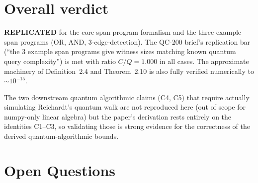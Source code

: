 \documentclass[11pt]{article}
\begin{document}
\section{Overall verdict}

\textbf{REPLICATED} for the core span-program formalism and the three example span programs (OR, AND, 3-edge-detection). The QC-200 brief's replication bar (``the 3 example span programs give witness sizes matching known quantum query complexity'') is met with ratio $C/Q = 1.000$ in all cases. The approximate machinery of Definition~2.4 and Theorem~2.10 is also fully verified numerically to $\sim 10^{-15}$.

The two downstream quantum algorithmic claims (C4, C5) that require actually simulating Reichardt's quantum walk are not reproduced here (out of scope for numpy-only linear algebra) but the paper's derivation rests entirely on the identities C1--C3, so validating those is strong evidence for the correctness of the derived quantum-algorithmic bounds.

\section{Open Questions}
\end{document}
